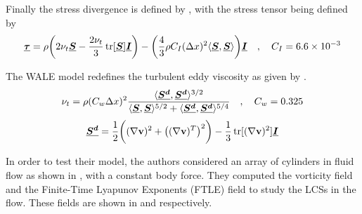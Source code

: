Finally the stress divergence is defined by , with the stress tensor being defined by 
\begin{equation}
    \underline{\bm{\tau}} = \rho \bigg( 2\nu_t \underline{\bm{S}} - \frac{2 \nu_t}{3}\operatorname{tr}[\underline{\bm{S}}]\underline{\bm{I}} \bigg) - \bigg( \frac{4}{3} \rho C_I (\Delta x)^2 \langle \underline{\bm{S}}, \underline{\bm{S}} \rangle \bigg) \underline{\bm{I}} \quad , \quad C_I = 6.6 \times {10}^{-3}
    \label{eq:Canelas2016-tau}
\end{equation}

The WALE model redefines the turbulent eddy viscosity as given by .
\begin{equation}
    \nu_t = \rho (C_w \Delta x)^2 \frac{\langle \underline{\bm{S^d}}, \underline{\bm{S^d}} \rangle^{3/2}}{\langle \underline{\bm{S}}, \underline{\bm{S}} \rangle^{5/2} + \langle \underline{\bm{S^d}}, \underline{\bm{S^d}} \rangle^{5/4}} \quad , \quad C_w=0.325
    \label{eq:Canelas2016-turbulent-eddy-visc}
\end{equation}
\begin{equation}
    \underline{\bm{S^d}} = \frac{1}{2} \bigg( (\nabla \mathbf{v})^2 + \big((\nabla \mathbf{v})^T\big)^2 \bigg) - \frac{1}{3} \operatorname{tr}[(\nabla \mathbf{v})^2] \underline{\bm{I}}
\end{equation}

In order to test their model, the authors considered an array of cylinders in fluid flow as shown in , with a constant body force. They computed the vorticity field and the Finite-Time Lyapunov Exponents (FTLE) field to study the LCSs in the flow. These fields are shown in  and  respectively.


